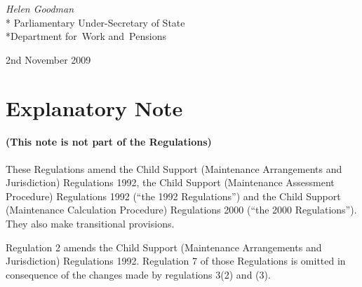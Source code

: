 \documentclass[12pt,a4paper]{article}
\begin{document}
{\raggedleft
\emph{Helen Goodman}\\*
Parliamentary Under-Secretary 
of State\\*Department 
for~Work and~Pensions

}

2nd November 2009

\small

\part{Explanatory Note}

\renewcommand\parthead{— Explanatory Note}

\subsection*{(This note is not part of the Regulations)}

These Regulations amend the Child Support (Maintenance Arrangements and Jurisdiction) Regulations 1992, the Child Support (Maintenance Assessment Procedure) Regulations 1992 (“the 1992 Regulations”) and the Child Support (Maintenance Calculation Procedure) Regulations 2000 (“the 2000 Regulations”). They also make transitional provisions.

Regulation 2 amends the Child Support (Maintenance Arrangements and Jurisdiction) Regulations 1992. Regulation 7 of those Regulations is omitted in consequence of the changes made by regulations 3(2) and (3).
\end{document}
